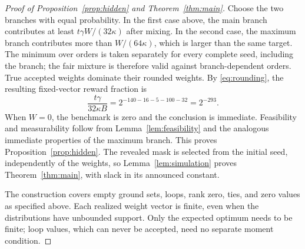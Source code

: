 \begin{proof}[Proof of Proposition~\ref{prop:hidden} and Theorem~\ref{thm:main}]
Choose the two branches with equal probability. In the first case above,
the main branch contributes at least $t\gamma W/(32\kappa)$ after mixing.
In the second case, the maximum branch contributes more than
$W/(64\kappa)$, which is larger than the same target. The minimum over
orders is taken separately for every complete seed, including the branch;
the fair mixture is therefore valid against branch-dependent orders.
True accepted weights dominate their rounded weights. By
\eqref{eq:rounding}, the resulting fixed-vector reward fraction is
\[
 \frac{t\gamma}{32\kappa B}
      =2^{-140-16-5-100-32}=2^{-293}.
\]
When $W=0$, the benchmark is zero and the conclusion is immediate.
Feasibility and measurability follow from Lemma~\ref{lem:feasibility} and
the analogous immediate properties of the maximum branch. This proves
Proposition~\ref{prop:hidden}. The revealed mask is selected from the
initial seed, independently of the weights, so Lemma~\ref{lem:simulation}
proves Theorem~\ref{thm:main}, with slack in its announced constant.

The construction covers empty ground sets, loops, rank zero, ties, and
zero values as specified above. Each realized weight vector is finite,
even when the distributions have unbounded support. Only the expected
optimum needs to be finite; loop values, which can never be accepted,
need no separate moment condition.
\end{proof}
